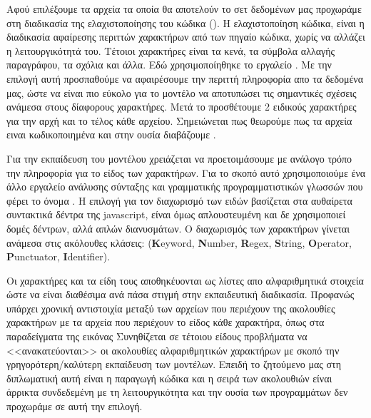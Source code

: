 Αφού επιλέξουμε τα αρχεία τα οποία θα αποτελούν το σετ δεδομένων μας προχωράμε στη διαδικασία της ελαχιστοποίησης του κώδικα ().
Η ελαχιστοποίηση κώδικα, είναι η διαδικασία αφαίρεσης περιττών χαρακτήρων από των πηγαίο κώδικα, χωρίς να αλλάζει η λειτουργικότητά του. Τέτοιοι χαρακτήρες είναι τα κενά, τα σύμβολα αλλαγής παραγράφου, τα σχόλια και άλλα. Εδώ χρησιμοποίηθηκε το εργαλείο .
Με την επιλογή αυτή προσπαθούμε να αφαιρέσουμε την περιττή πληροφορία απο τα δεδομένα μας, ώστε να είναι πιο εύκολο για το μοντέλο να αποτυπώσει τις σημαντικές σχέσεις ανάμεσα στους δίαφορους χαρακτήρες.
Μετά το  προσθέτουμε 2 ειδικούς χαρακτήρες για την αρχή και το τέλος κάθε αρχείου. Σημειώνεται πως θεωρούμε πως τα αρχεία ειναι  κωδικοποιημένα και στην ουσία διαβάζουμε . 

Για την εκπαίδευση του μοντέλου  χρειάζεται να προετοιμάσουμε με ανάλογο τρόπο την πληροφορία για το είδος των χαρακτήρων. Για το σκοπό αυτό χρησιμοποιούμε ένα άλλο εργαλείο ανάλυσης σύνταξης και γραμματικής προγραμματιστικών γλωσσών που φέρει το όνομα .
Η επιλογή για τον διαχωρισμό των ειδών βασίζεται στα αυθαίρετα συντακτικά δέντρα  της javascript, είναι όμως απλουστευμένη και δε χρησιμοποιεί δομές δέντρων, αλλά απλών διανυσμάτων.
Ο διαχωρισμός των χαρακτήρων γίνεται ανάμεσα στις ακόλουθες κλάσεις: (\textbf{K}eyword, \textbf{N}umber, \textbf{R}egex, \textbf{S}tring, \textbf{O}perator, \textbf{P}unctuator, \textbf{I}dentifier).

Οι χαρακτήρες και τα είδη τους αποθηκέυονται ως λίστες απο αλφαριθμητικά στοιχεία ώστε να είναι διαθέσιμα ανά πάσα στιγμή στην εκπαιδευτική διαδικασία.
Προφανώς υπάρχει χρονική αντιστοιχία μεταξύ των αρχείων που περιέχουν της ακολουθίες χαρακτήρων με τα αρχεία που περιέχουν το είδος κάθε χαρακτήρα, όπως στα παραδείγματα της εικόνας %
Συνηθίζεται σε τέτοιου είδους προβλήματα να <<ανακατεύονται>> οι ακολουθίες αλφαριθμητικών χαρακτήρων με σκοπό την γρηγορότερη/καλύτερη εκπαίδευση των μοντέλων.
Επειδή το ζητούμενο μας στη διπλωματική αυτή είναι η παραγωγή κώδικα και η σειρά των ακολουθιών είναι άρρικτα συνδεδεμένη με τη λειτουργικότητα και την ουσία των προγραμμάτων δεν προχωράμε σε αυτή την επιλογή.  


\section{}

\section{}

